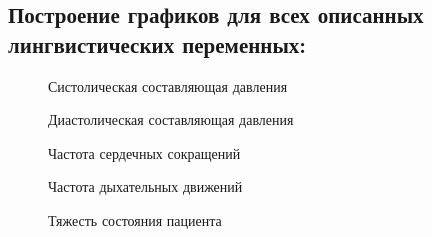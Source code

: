 		\subsection{Построение графиков для всех описанных лингвистических переменных:}
			\begin{figure}[h!]
				\center{\texttt{[image: v1]}}
				\caption{Систолическая составляющая давления}
				\label{systol}
			\end{figure}
		
			\begin{figure}[h!]
				\center{\texttt{[image: v2]}}
				\caption{Диастолическая составляющая давления}
				\label{diastol}
			\end{figure}
		
			\begin{figure}[h!]
				\center{\texttt{[image: v3]}}
				\caption{Частота сердечных сокращений}
				\label{pulse}
			\end{figure}
		
			\begin{figure}[h!]
				\center{\texttt{[image: v4]}}
				\caption{Частота дыхательных движений}
				\label{breath}
			\end{figure}
		
			\begin{figure}[h!]
				\center{\texttt{[image: r1]}}
				\caption{Тяжесть состояния пациента}
				\label{health}
			\end{figure}
		
